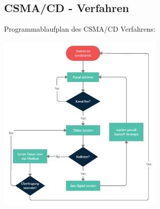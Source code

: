 \documentclass[12pt,a4paper]{article}
\begin{document}
		\subsection{CSMA/CD - Verfahren}
			Programmablaufplan des CSMA/CD Verfahrens:
			\begin{center}
				\includegraphics[width=0.6\textwidth]{Bilder/CSMACD.png}
			\end{center}
		
\end{document}
